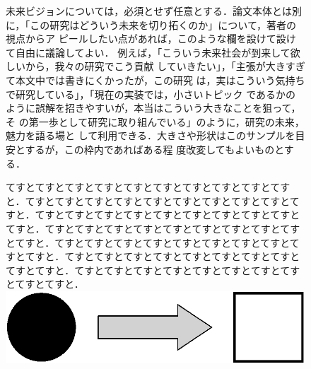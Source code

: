 \documentclass[twoside]{wiss}
\begin{document}
\begin{figure}[!b]
{\begin{minipage}[b]{0.9\textwidth}
\begin{multicols}{2}
未来ビジョンについては，必須とせず任意とする．論文本体とは別
に，「この研究はどういう未来を切り拓くのか」について，著者の視点からア
ピールしたい点があれば，このような欄を設けて設けて自由に議論してよい．
例えば，「こういう未来社会が到来して欲しいから，我々の研究でこう貢献
していきたい」，「主張が大きすぎて本文中では書きにくかったが，この研究
は，実はこういう気持ちで研究している」，「現在の実装では，小さいトピック
であるかのように誤解を招きやすいが，本当はこういう大きなことを狙って，そ
の第一歩として研究に取り組んでいる」のように，研究の未来，魅力を語る場と
して利用できる．大きさや形状はこのサンプルを目安とするが，この枠内であればある程
度改変してもよいものとする．

てすとてすとてすとてすとてすとてすとてすとてすとてすとてすと．てすとてすとてすとてすとてすとてすとてすとてすとてすとてすと．てすとてすとてすとてすとてすとてすとてすとてすとてすとてすと．てすとてすとてすとてすとてすとてすとてすとてすとてすとてすと．てすとてすとてすとてすとてすとてすとてすとてすとてすとてすと．てすとてすとてすとてすとてすとてすとてすとてすとてすとてすと．てすとてすとてすとてすとてすとてすとてすとてすとてすとてすと．
\vspace*{5mm}
\includegraphics[width=0.95\columnwidth]{vision.eps}

\end{multicols}
\end{minipage}
}

\newlength{\FUTUREHT}
\setlength{\FUTUREHT}{\the\ht\FUTURE}	%
\hspace*{0.045\textwidth}	%
\box\FUTURE
\vspace*{-\the\FUTUREHT}	%
\vspace*{-10.9mm}		%

\begin{center}
\fboxrule=0pt
\end{center}
\end{figure}

\end{document}
